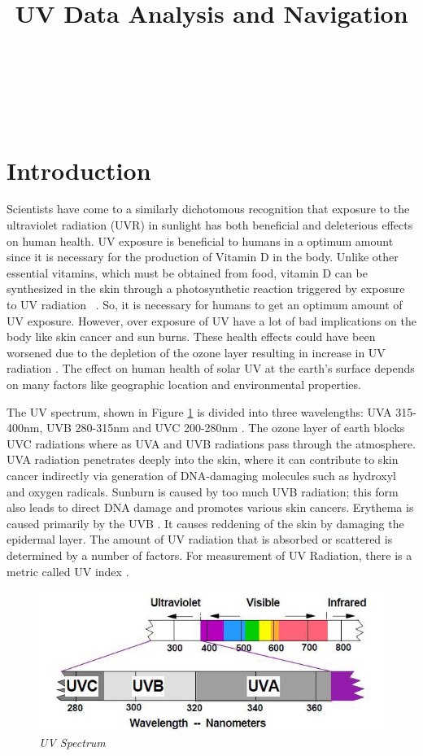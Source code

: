 \documentclass[10pt]{sigplan-proc-varsize}
\author{
%
\alignauthor{Aditya Modi, Jerrid Matthews, Mario Gerla } \\
        \affaddr{Department of Computer Science}\\
        \affaddr{University of California, Los Angeles}\\
        \affaddr{Los Angeles. CA 90024}\\
       \email{\{adityam, matth122, gerla\}@cs.ucla.edu}
}
\title{\textbf{ UV Data Analysis and Navigation}}
\begin{document}
\maketitle


\section{Introduction}
Scientists have come to a similarly dichotomous recognition that exposure to the ultraviolet radiation (UVR) in sunlight has both beneficial and deleterious effects on human health. UV exposure is beneficial to humans in a optimum amount since it is necessary for the production of Vitamin D in the body. Unlike other essential vitamins, which must be obtained from food, vitamin D can be synthesized in the skin through a photosynthetic reaction triggered by exposure to UV radiation ~\cite{dep1}. So, it is necessary for humans to get an optimum amount of UV exposure. However, over exposure of UV have a lot of bad implications on the body like skin cancer and sun burns. These health effects could have been worsened due to the depletion of the ozone layer resulting in increase in UV radiation \cite{dep2}. The effect on human health of solar UV at the earth’s surface depends on many factors like geographic location and environmental properties.  

The UV spectrum, shown in Figure \ref{fig:uvSpectrum} is divided into three wavelengths: UVA 315-400nm, UVB 280-315nm and UVC 200-280nm \cite{dep4}. The ozone layer of earth blocks UVC radiations where as UVA and UVB radiations pass through the atmosphere. UVA radiation penetrates deeply into the skin, where it can contribute to skin cancer indirectly via generation of DNA-damaging molecules such as hydroxyl and oxygen radicals. Sunburn is caused by too much UVB radiation; this form also leads to direct DNA damage and promotes various skin cancers. Erythema is caused primarily by the UVB \cite{dep3}. It causes reddening of the skin by damaging the epidermal layer. The amount of UV radiation that is absorbed or scattered is determined by a number of factors. For measurement of UV Radiation, there is a metric called UV index \cite{dep5}. 
\begin{figure}
\begin{center}
\includegraphics[scale=0.40]{uvSpectrum.png}
\caption{\small \sl UV Spectrum\label{fig:uvSpectrum}}
\end{center}
\end{figure}
\end{document}
